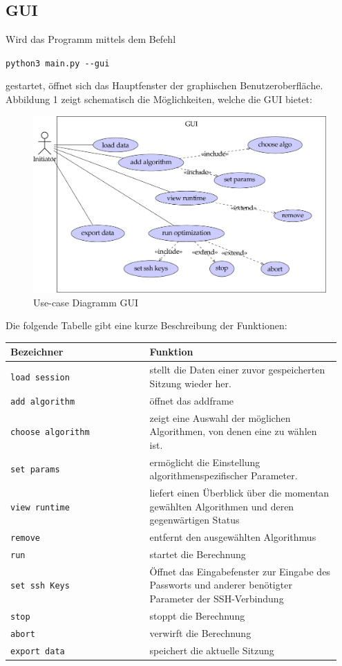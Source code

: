 \documentclass[
  a4paper,               %
  twoside,               %
  DIV=12,                %
  BCOR=8mm,              %
  headinclude=true,      %
  footinclude=false,     %
  numbers=noenddot,      %
  headheight=40pt,       %
  11pt]{scrartcl}        %
\begin{document}
\subsection{GUI}
\begin{samepage}
Wird das Programm mittels dem Befehl
\begin{center}
\texttt{python3 main.py -{}-gui}
\end{center}
gestartet, öffnet sich das Hauptfenster der graphischen Benutzeroberfläche.
Abbildung 1 zeigt schematisch die Möglichkeiten, welche die GUI bietet:\\
\begin{figure}[h]
\includegraphics[scale = 2.5]{../presentation/GUI-use-case.png}
\caption{Use-case Diagramm GUI}
\end{figure}
\newpage
Die folgende Tabelle gibt eine kurze Beschreibung der Funktionen:\\[0.5cm]
\begin{tabular}{p{0.4\linewidth}|p{0.55\linewidth}}
	\toprule
	Bezeichner & Funktion\tabularnewline
	\midrule
	\texttt{load session} & stellt die Daten einer zuvor gespeicherten Sitzung wieder her.\tabularnewline
	\texttt{add\ algorithm} & öffnet das addframe\tabularnewline
	\texttt{choose\ algorithm} & zeigt eine Auswahl der möglichen Algorithmen, von denen eine zu wählen ist.\tabularnewline
	\texttt{set\ params} & ermöglicht die Einstellung algorithmenspezifischer Parameter.\tabularnewline
	\texttt{view\ runtime} & liefert einen Überblick über die momentan gewählten Algorithmen und deren gegenwärtigen Status\tabularnewline
	\texttt{remove} & entfernt den ausgewählten Algorithmus\tabularnewline
	\texttt{run} & startet die Berechnung\tabularnewline
	\texttt{set\ ssh\ Keys} & Öffnet das Eingabefenster zur Eingabe des
	Passworts und anderer benötigter Parameter der SSH-Verbindung\tabularnewline
	\texttt{stop} & stoppt die Berechnung\tabularnewline
	\texttt{abort} & verwirft die Berechnung\tabularnewline
	\texttt{export data} & speichert die aktuelle Sitzung\tabularnewline
	\bottomrule
\end{tabular}\\
\end{samepage}
\end{document}
